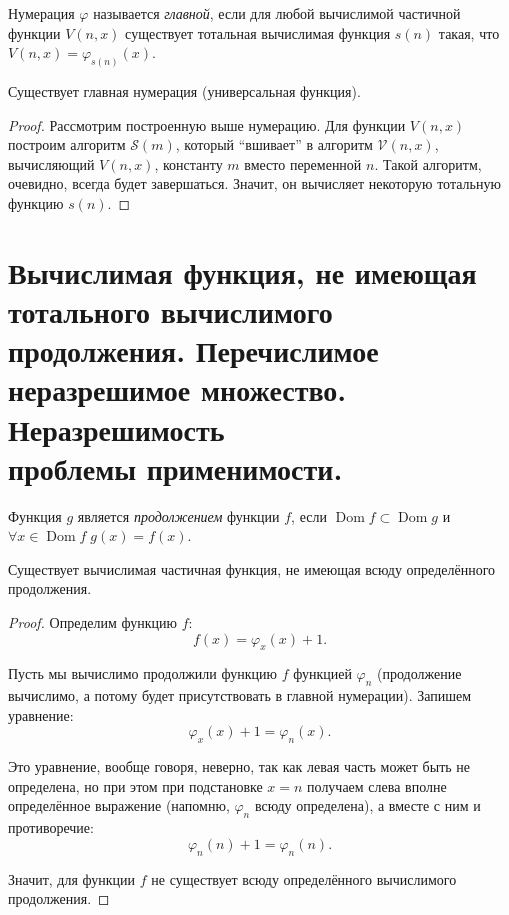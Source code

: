 \documentclass{article}
\begin{document}
    \begin{definition}
        Нумерация $\varphi$ называется \textit{главной}, если для любой вычислимой частичной
        функции $V(n, x)$ существует тотальная вычислимая функция $s(n)$ такая, что $V(n, x)
        = \varphi_{s(n)}(x)$.
    \end{definition}

    \begin{theorem}
        Существует главная нумерация (универсальная функция).
    \end{theorem}

    \begin{proof}
        Рассмотрим построенную выше нумерацию. Для функции $V(n, x)$ построим алгоритм $\mathcal{S}(m)$,
        который ``вшивает'' в алгоритм $\mathcal{V}(n, x)$, вычисляющий $V(n, x)$, константу $m$ вместо
        переменной $n$. Такой алгоритм, очевидно, всегда будет завершаться. Значит, он вычисляет
        некоторую тотальную функцию $s(n)$.
    \end{proof}

    \section{Вычислимая функция, не имеющая тотального вычислимого продолжения. Перечислимое неразрешимое
    множество. Неразрешимость \\ проблемы применимости.}

    \begin{definition}
        Функция $g$ является \textit{продолжением} функции $f$, если $\operatorname{Dom} f \subset
        \operatorname{Dom} g$ и $\forall x \in \operatorname{Dom} f \; g(x) = f(x)$.
    \end{definition}

    \begin{theorem}
        Существует вычислимая частичная функция, не имеющая всюду определённого продолжения.
    \end{theorem}
    \begin{proof}
        Определим функцию $f$:
        $$
            f(x) = \varphi_x(x) + 1.
        $$

        Пусть мы вычислимо продолжили функцию $f$ функцией $\varphi_n$ (продолжение вычислимо, а потому
        будет присутствовать в главной нумерации). Запишем уравнение:
        $$
            \varphi_x(x) + 1 = \varphi_n(x).
        $$

        Это уравнение, вообще говоря, неверно, так как левая часть может быть не определена, но при
        этом при подстановке $x = n$ получаем слева вполне определённое выражение (напомню,
        $\varphi_n$ всюду определена), а вместе с ним и противоречие:
        $$
            \varphi_n(n) + 1 = \varphi_n(n).
        $$

        Значит, для функции $f$ не существует всюду определённого вычислимого продолжения.
    \end{proof}
\end{document}
